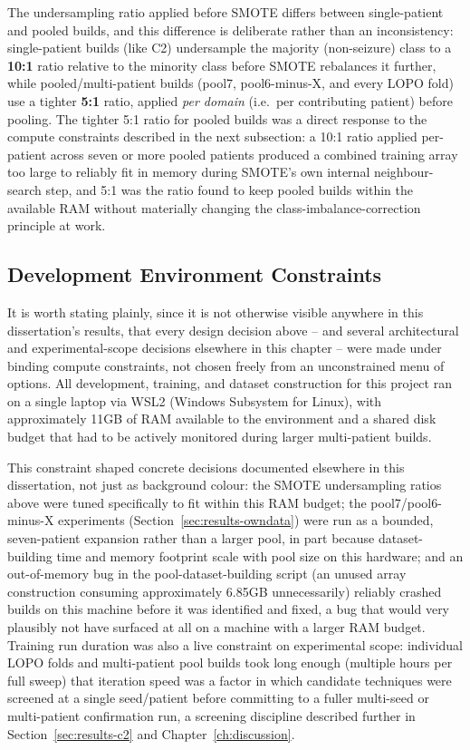 The undersampling ratio applied before SMOTE differs between single-patient and pooled builds, and this difference is deliberate rather than an inconsistency: 
single-patient builds (like C2) undersample the majority (non-seizure) class to a \textbf{10:1} ratio relative to the minority class before SMOTE rebalances it further, 
while pooled/multi-patient builds (pool7, pool6-minus-X, and every LOPO fold) use a tighter \textbf{5:1} ratio, applied \emph{per domain} (i.e.\ per contributing patient) before 
pooling. The tighter 5:1 ratio for pooled builds was a direct response to the compute constraints described in the next subsection: a 10:1 ratio applied per-patient across seven or
more pooled patients produced a combined training array too large to reliably fit in memory during SMOTE's own internal neighbour-search step, and 5:1 was the ratio found to keep 
pooled builds within the available RAM without materially changing the class-imbalance-correction principle at work.

\subsection{Development Environment Constraints}

It is worth stating plainly, since it is not otherwise visible anywhere in this dissertation's results, that every design decision above -- and several architectural and 
experimental-scope decisions elsewhere in this chapter -- were made under binding compute constraints, not chosen freely from an unconstrained menu of options. All development, 
training, and dataset construction for this project ran on a single laptop via WSL2 (Windows Subsystem for Linux), with approximately 11GB of RAM available to the 
environment and a shared disk budget that had to be actively monitored during larger multi-patient builds.

This constraint shaped concrete decisions documented elsewhere in this dissertation, not just as background colour: the SMOTE undersampling ratios above were tuned specifically to fit within this RAM budget; the pool7/pool6-minus-X experiments (Section~\ref{sec:results-owndata}) were run as a bounded, seven-patient expansion rather than a larger pool, in part because dataset-building time and memory footprint scale with pool size on this hardware; and an out-of-memory bug in the pool-dataset-building script (an unused array construction consuming approximately 6.85GB unnecessarily) reliably crashed builds on this machine before it was identified and fixed, a bug that would very plausibly not have surfaced at all on a machine with a larger RAM budget. Training run duration was also a live constraint on experimental scope: individual LOPO folds and multi-patient pool builds took long enough (multiple hours per full sweep) that iteration speed was a factor in which candidate techniques were screened at a single seed/patient before committing to a fuller multi-seed or multi-patient confirmation run, a screening discipline described further in Section~\ref{sec:results-c2} and Chapter~\ref{ch:discussion}.


